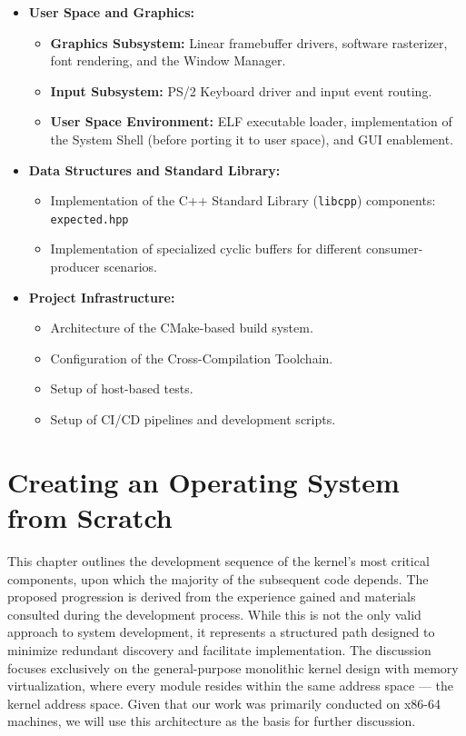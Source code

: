 \documentclass[a4paper,10pt,twoside]{report}
\theoremstyle{definition}
\begin{document}
\begin{itemize}
    \item \textbf{User Space and Graphics:}
        \begin{itemize}
            \item \textbf{Graphics Subsystem:} Linear framebuffer drivers, software rasterizer, font rendering, and the Window Manager.
            \item \textbf{Input Subsystem:} PS/2 Keyboard driver and input event routing.
            \item \textbf{User Space Environment:} ELF executable loader, implementation of the System Shell (before porting it to user space), and GUI enablement.
        \end{itemize}

    \item \textbf{Data Structures and Standard Library:}
        \begin{itemize}
            \item Implementation of the C++ Standard Library (\texttt{libcpp}) components: \texttt{expected.hpp}
            \item Implementation of specialized cyclic buffers for different consumer-producer scenarios.
        \end{itemize}

    \item \textbf{Project Infrastructure:}
        \begin{itemize}
            \item Architecture of the CMake-based build system.
            \item Configuration of the Cross-Compilation Toolchain.
            \item Setup of host-based tests.
            \item Setup of CI/CD pipelines and development scripts.
        \end{itemize}
\end{itemize}



\chapter{Creating an Operating System from Scratch}
\label{chap:os_from_scratch}

This chapter outlines the development sequence of the kernel's most critical components, upon which the majority of the subsequent code depends. The proposed progression is derived from the experience gained and materials consulted during the development process. While this is not the only valid approach to system development, it represents a structured path designed to minimize redundant discovery and facilitate implementation. The discussion focuses exclusively on the general-purpose monolithic kernel design with memory virtualization, where every module resides within the same address space --- the kernel address space. Given that our work was primarily conducted on x86-64 machines, we will use this architecture as the basis for further discussion.
\end{document}
